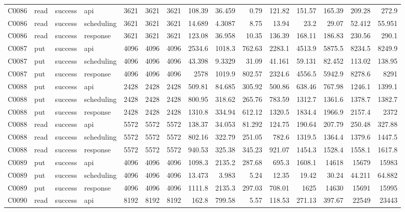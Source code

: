 \begin{landscape}
\begin{longtable}{llllrrrrrrrrrrr}
C0086 & read & success & api & 3621 & 3621 & 3621 & 108.39 & 36.459 & 0.79 & 121.82 & 151.57 & 165.39 & 209.28 & 272.9\\
C0086 & read & success & scheduling & 3621 & 3621 & 3621 & 14.689 & 4.3087 & 8.75 & 13.94 & 23.2 & 29.07 & 52.412 & 55.951\\
C0086 & read & success & response & 3621 & 3621 & 3621 & 123.08 & 36.958 & 10.35 & 136.39 & 168.11 & 186.83 & 230.56 & 290.1\\
C0087 & put & success & api & 4096 & 4096 & 4096 & 2534.6 & 1018.3 & 762.63 & 2283.1 & 4513.9 & 5875.5 & 8234.5 & 8249.9\\
C0087 & put & success & scheduling & 4096 & 4096 & 4096 & 43.398 & 9.3329 & 31.09 & 41.161 & 59.131 & 82.452 & 113.02 & 138.95\\
C0087 & put & success & response & 4096 & 4096 & 4096 & 2578 & 1019.9 & 802.57 & 2324.6 & 4556.5 & 5942.9 & 8278.6 & 8291\\
C0088 & put & success & api & 2428 & 2428 & 2428 & 509.81 & 84.685 & 305.92 & 500.86 & 638.46 & 767.98 & 1246.1 & 1399.1\\
C0088 & put & success & scheduling & 2428 & 2428 & 2428 & 800.95 & 318.62 & 265.76 & 783.59 & 1312.7 & 1361.6 & 1378.7 & 1382.7\\
C0088 & put & success & response & 2428 & 2428 & 2428 & 1310.8 & 334.94 & 612.12 & 1320.5 & 1834.4 & 1966.9 & 2157.4 & 2372\\
C0088 & read & success & api & 5572 & 5572 & 5572 & 138.37 & 34.053 & 81.292 & 124.75 & 190.64 & 207.79 & 250.48 & 327.88\\
C0088 & read & success & scheduling & 5572 & 5572 & 5572 & 802.16 & 322.79 & 251.05 & 782.6 & 1319.5 & 1364.4 & 1379.6 & 1447.5\\
C0088 & read & success & response & 5572 & 5572 & 5572 & 940.53 & 325.38 & 345.23 & 921.07 & 1454.3 & 1528.4 & 1558.1 & 1617.8\\
C0089 & put & success & api & 4096 & 4096 & 4096 & 1098.3 & 2135.2 & 287.68 & 695.3 & 1608.1 & 14618 & 15679 & 15983\\
C0089 & put & success & scheduling & 4096 & 4096 & 4096 & 13.473 & 3.983 & 5.24 & 12.35 & 19.42 & 30.24 & 44.211 & 64.882\\
C0089 & put & success & response & 4096 & 4096 & 4096 & 1111.8 & 2135.3 & 297.03 & 708.01 & 1625 & 14630 & 15691 & 15995\\
C0090 & read & success & api & 8192 & 8192 & 8192 & 162.8 & 799.58 & 5.57 & 118.53 & 271.13 & 397.67 & 22549 & 23443\\

\end{longtable}
\end{landscape}
